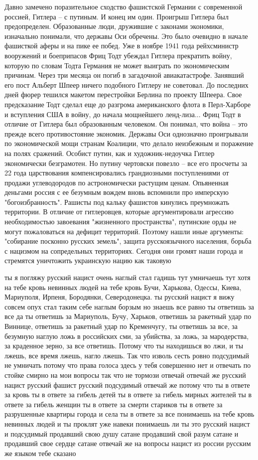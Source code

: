 Давно замечено поразительное сходство фашистской Германии с современной россией, Гитлера – с путиным. И конец им один.
Проигрыш
Гитлера был предопределен. Образованные люди, дружившие с законами
экономики, изначально понимали, что державы Оси обречены. Это было
очевидно в начале фашисткой аферы и на пике ее побед. Уже в ноябре 1941
года рейхсминистр вооружений и боеприпасов Фриц Тодт убеждал Гитлера
прекратить войну, которую по словам Тодта Германия не может выиграть по
экономическим причинам. Через три месяца он погиб в загадочной
авиакатастрофе. Занявший его пост Альберт Шпеер ничего подобного Гитлеру
не советовал. До последних дней фюрер тешился макетом перестройки
Берлина по проекту Шпеера.
Свое предсказание Тодт сделал еще до
разгрома американского флота в Перл-Харборе и вступления США в войну, до
начала мощнейшего ленд-лиза... Фриц Тодт в отличие от Гитлера был
образованным человеком. Он понимал, что война – это прежде всего
противостояние экономик. Державы Оси однозначно проигрывали по
экономической мощи странам Коалиции, что делало неизбежным и поражение
на полях сражений.
Особист путин, как и художник-недоучка Гитлер
экономически безграмотен. Но путину чертовски повезло – все его просчеты
за 22 года царствования компенсировались грандиозными поступлениями от
продажи углеводородов по астрономически растущим ценам. Опьяненная
деньгами россия с ее безумным вождем вновь вспомнили про имперскую
"богоизбранность". Рашисты под кальку фашистов кинулись преумножать
территории. В отличие от гитлеровцев, которые аргументировали агрессию
необходимостью завоевания "жизненного пространства", путинские орды не
могут пожаловаться на дефицит территорий. Поэтому нашли иные аргументы:
"собирание посконно русских земель", защита русскоязычного населения,
борьба с нацизмом на сопредельных территориях. Сегодня они громят наши
города и стремятся уничтожить украинскую нацию как таковую


ты я погляжу русский нацист очень наглый стал гадишь тут умничаешь тут хотя на
тебе кровь невинных людей на тебе кровь Бучи, Харькова, Одессы, Киева,
Мариуполя, Ирпеня, Бородянки, Северодонецка. ты русский нацист я вижу совсем
опух стал таким себе наглым борзым но знаешь все равно ты ответишь за все да ты
ответишь за Мариуполь, Бучу, Харьков, ответишь за ракетный удар по Виннице,
ответишь за ракетный удар по Кременчугу, ты ответишь за все, за безумную наглую
ложь в российских сми, за убийства, за ложь, за мародерства, за краденное
зерно, за все ответишь. Потому что ты находишься во лжи, и ты лжешь, все время
лжешь, нагло лжешь. Так что изволь сесть ровно подсудимый не умничать потому
что права голоса здесь у тебя совершенно нет и отвечать по стойке смирно на мои
вопросы так что не тормози отвечай отвечай же русский нацист русский фашист
русский подсудимый отвечай же потому что ты в ответе за кровь ты в ответе за
гибель детей ты в ответе за гибель мирных жителей ты в ответе за гибель женщин
ты в ответе за смерти стариков ты в ответе за разрушенные квартиры города и
села ты в ответе за все понимаешь на тебе кровь невинных людей и ты проклят уже
навеки понимаешь ли ты это русский нацист и подсудимый продавший свою душу
сатане продавший свой разум сатане и продавший свое сердце сатане отвечай же на
вопросы нацист из россии русским же языком тебе сказано

